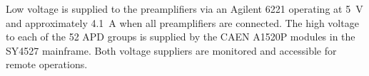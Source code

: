 Low voltage is supplied to the preamplifiers via an Agilent 6221 operating at 5~V and approximately 4.1~A when all preamplifiers are connected. The high voltage to each of the 52 APD groups is supplied by the CAEN A1520P modules in the SY4527 mainframe. Both voltage suppliers are monitored and accessible for remote operations.  
